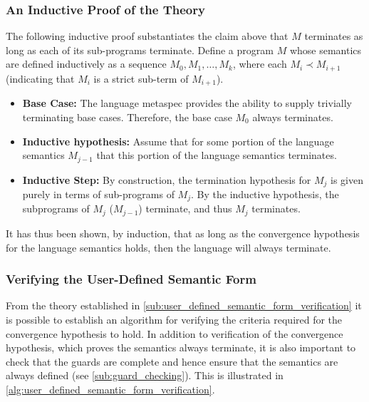 \subsubsection{An Inductive Proof of the Theory} %
\label{ssub:an_inductive_proof_of_the_theory}
The following inductive proof substantiates the claim above that $M$ terminates as long as each of its sub-programs terminate. 
Define a program $M$ whose semantics are defined inductively as a sequence $M_0, M_1, \dots, M_k$, where each $M_i \prec M_{i+1}$ (indicating that $M_i$ is a strict sub-term of $M_{i+1}$).
\begin{itemize}
    \item \textbf{Base Case:} The language \gls{metaspec} provides the ability to supply trivially terminating base cases.
    Therefore, the base case $M_0$ always terminates. 
    \item \textbf{Inductive hypothesis:} Assume that for some portion of the language semantics $M_{j-1}$ that this portion of the language semantics terminates.
    \item \textbf{Inductive Step:} By construction, the termination hypothesis for $M_j$ is given purely in terms of sub-programs of $M_j$. 
    By the inductive hypothesis, the subprograms of $M_j$ ($M_{j-1}$) terminate, and thus $M_j$ terminates.
\end{itemize}

It has thus been shown, by induction, that as long as the convergence hypothesis for the language semantics holds, then the language will always terminate.


\subsubsection{Verifying the User-Defined Semantic Form} %
\label{ssub:verifying_the_user_defined_semantic_form}
From the theory established in \autoref{sub:user_defined_semantic_form_verification} it is possible to establish an algorithm for verifying the criteria required for the convergence hypothesis to hold.
In addition to verification of the convergence hypothesis, which proves the semantics always terminate, it is also important to check that the guards are complete and hence ensure that the semantics are always defined (see \autoref{sub:guard_checking}).
This is illustrated in \autoref{alg:user_defined_semantic_form_verification}.

